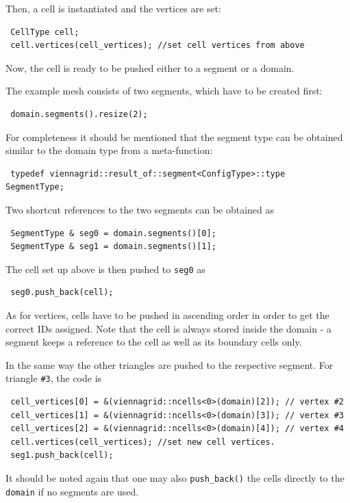 
Then, a cell is instantiated and the vertices are set:
\begin{lstlisting}
 CellType cell;
 cell.vertices(cell_vertices); //set cell vertices from above
\end{lstlisting}
Now, the cell is ready to be pushed either to a segment or a domain. 

The example mesh consists of two segments, which have to be created first:
\begin{lstlisting}
 domain.segments().resize(2);
\end{lstlisting}
For completeness it should be mentioned that the segment type can be obtained similar to the domain type from a meta-function:
\begin{lstlisting}
 typedef viennagrid::result_of::segment<ConfigType>::type   SegmentType;
\end{lstlisting}
Two shortcut references to the two segments can be obtained as
\begin{lstlisting}
 SegmentType & seg0 = domain.segments()[0];
 SegmentType & seg1 = domain.segments()[1];
\end{lstlisting}
The cell set up above is then pushed to \lstinline|seg0| as
\begin{lstlisting}
 seg0.push_back(cell);
\end{lstlisting}
As for vertices, cells have to be pushed in ascending order in order to get the correct IDs assigned. Note that the cell is always stored inside the domain - a segment keeps a reference to the cell as well as its boundary cells only.

In the same way the other triangles are pushed to the respective segment. For triangle \lstinline|#3|, the code is
\begin{lstlisting}
 cell_vertices[0] = &(viennagrid::ncells<0>(domain)[2]); // vertex #2
 cell_vertices[1] = &(viennagrid::ncells<0>(domain)[3]); // vertex #3
 cell_vertices[2] = &(viennagrid::ncells<0>(domain)[4]); // vertex #4
 cell.vertices(cell_vertices); //set new cell vertices.
 seg1.push_back(cell);
\end{lstlisting}
It should be noted again that one may also \lstinline|push_back()| the cells directly to the \lstinline|domain| if no segments are used.

